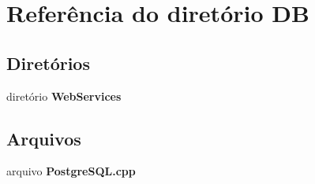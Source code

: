 \section{Referência do diretório DB}
\label{dir_d0baa470185151df511a3e923bbf3693}
\subsection*{Diretórios}
\begin{DoxyCompactItemize}
\item 
diretório {\bf Web\+Services}
\end{DoxyCompactItemize}
\subsection*{Arquivos}
\begin{DoxyCompactItemize}
\item 
arquivo {\bf Postgre\+S\+Q\+L.\+cpp}
\end{DoxyCompactItemize}
